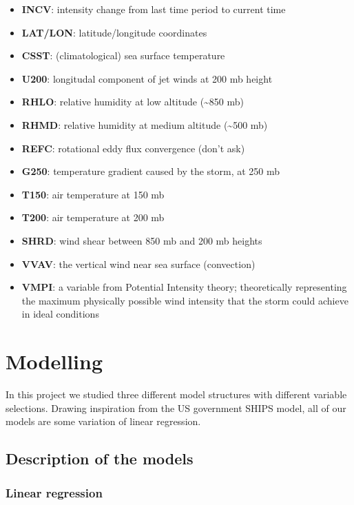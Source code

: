 \documentclass[
]{article}
\providecommand{\tightlist}{%
  \setlength{\itemsep}{0pt}\setlength{\parskip}{0pt}}
\begin{document}
\begin{itemize}
\tightlist
\item
  \textbf{INCV}: intensity change from last time period to current time
\item
  \textbf{LAT/LON}: latitude/longitude coordinates
\item
  \textbf{CSST}: (climatological) sea surface temperature
\item
  \textbf{U200}: longitudal component of jet winds at 200 mb height
\item
  \textbf{RHLO}: relative humidity at low altitude (\textasciitilde850
  mb)
\item
  \textbf{RHMD}: relative humidity at medium altitude
  (\textasciitilde500 mb)
\item
  \textbf{REFC}: rotational eddy flux convergence (don't ask)
\item
  \textbf{G250}: temperature gradient caused by the storm, at 250 mb
\item
  \textbf{T150}: air temperature at 150 mb
\item
  \textbf{T200}: air temperature at 200 mb
\item
  \textbf{SHRD}: wind shear between 850 mb and 200 mb heights
\item
  \textbf{VVAV}: the vertical wind near sea surface (convection)
\item
  \textbf{VMPI}: a variable from Potential Intensity theory;
  theoretically representing the maximum physically possible wind
  intensity that the storm could achieve in ideal conditions
\end{itemize}

\newpage

\hypertarget{modelling}{%
\section{Modelling}\label{modelling}}

In this project we studied three different model structures with
different variable selections. Drawing inspiration from the US
government SHIPS model, all of our models are some variation of linear
regression.

\hypertarget{description-of-the-models}{%
\subsection{Description of the models}\label{description-of-the-models}}

\hypertarget{linear-regression}{%
\subsubsection{Linear regression}\label{linear-regression}}
\end{document}
